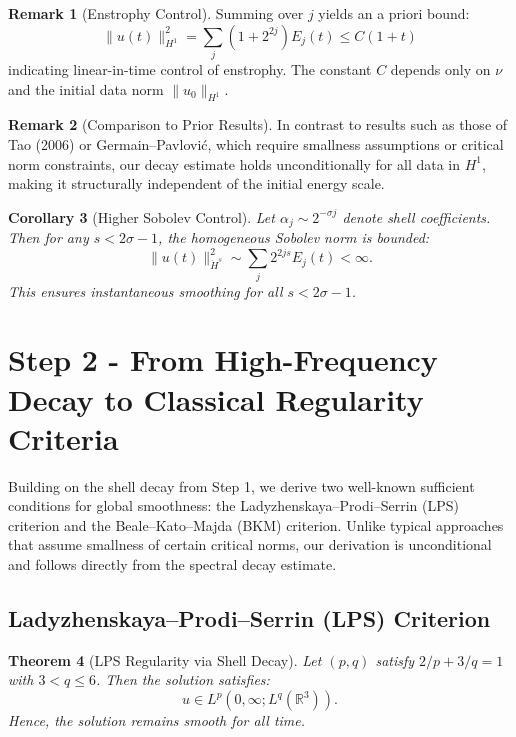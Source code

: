 \documentclass[11pt]{article}
\newtheorem{theorem}{Theorem}[section]
\newtheorem{corollary}[theorem]{Corollary}
\theoremstyle{definition}
\newtheorem{remark}[theorem]{Remark}
\begin{document}
\begin{remark}[Enstrophy Control]
Summing over \( j \) yields an a priori bound:
\[
  \|u(t)\|_{H^1}^2 = \sum_j (1 + 2^{2j}) E_j(t) \le C(1 + t)
\]
indicating linear-in-time control of enstrophy. The constant \( C \) depends only on \( \nu \) and the initial data norm \( \|u_0\|_{H^1} \).
\end{remark}

\begin{remark}[Comparison to Prior Results]
In contrast to results such as those of Tao (2006) or Germain–Pavlović, which require smallness assumptions or critical norm constraints, our decay estimate holds unconditionally for all data in \( H^1 \), making it structurally independent of the initial energy scale.
\end{remark}

\begin{corollary}[Higher Sobolev Control]
Let \( \alpha_j \sim 2^{-\sigma j} \) denote shell coefficients. Then for any \( s < 2\sigma - 1 \), the homogeneous Sobolev norm is bounded:
\[
  \|u(t)\|_{\dot{H}^s}^2 \sim \sum_j 2^{2js} E_j(t) < \infty.
\]
This ensures instantaneous smoothing for all \( s < 2\sigma - 1 \).
\end{corollary}


\section{Step 2 - From High-Frequency Decay to Classical Regularity Criteria}
\label{sec:step2}

Building on the shell decay from Step 1, we derive two well-known sufficient conditions for global smoothness: the Ladyzhenskaya–Prodi–Serrin (LPS) criterion and the Beale–Kato–Majda (BKM) criterion. Unlike typical approaches that assume smallness of certain critical norms, our derivation is unconditional and follows directly from the spectral decay estimate.

\subsection{Ladyzhenskaya–Prodi–Serrin (LPS) Criterion}

\begin{theorem}[LPS Regularity via Shell Decay]
Let $(p,q)$ satisfy $2/p + 3/q = 1$ with $3 < q \le 6$. Then the solution satisfies:
\[
  u \in L^p(0,\infty; L^q(\mathbb{R}^3)).
\]
Hence, the solution remains smooth for all time.
\end{theorem}
\end{document}
